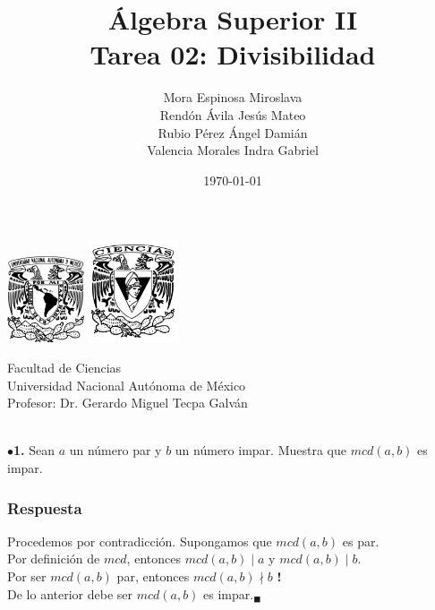 \documentclass[12pt]{article}
\title{\textbf{Álgebra Superior II\\
		Tarea 02: Divisibilidad}}
\author{Mora Espinosa Miroslava\\ Rendón Ávila Jesús Mateo\\ Rubio Pérez Ángel Damián\\ Valencia Morales Indra Gabriel}
\date{\today}
\begin{document}
	\maketitle
	\begin{center}
		\vspace{2cm}
		\includegraphics[width=0.17\textwidth]{Escudo.png}
		\hspace{0.5cm}
		\includegraphics[width=0.2\textwidth]{logo_ciencias.png}
	\end{center}
	\begin{center}
		\vspace{1cm}
		Facultad de Ciencias\\
		Universidad Nacional Autónoma de México\\
		\vspace{3cm}
		Profesor: Dr. Gerardo Miguel Tecpa Galván\\
	\end{center}
	
	\newpage
	
	$ \ $ \\
	$\bullet$\textbf{1.} Sean $a$ un número par y $b$ un número impar. Muestra que $mcd(a, b)$ es impar.
	\subsubsection*{Respuesta}
	Procedemos por contradicción. Supongamos que $mcd(a, b)$ es par.\\
	
	Por definición de $mcd$, entonces $mcd(a,b) \mid a$ y $mcd(a,b) \mid b$.\\
	
	Por ser $mcd(a,b)$ par, entonces $mcd(a,b) \nmid b$ \textbf{!}\\
	
	De lo anterior debe ser $mcd(a,b)$ es impar.$_\blacksquare$
	
\end{document}
